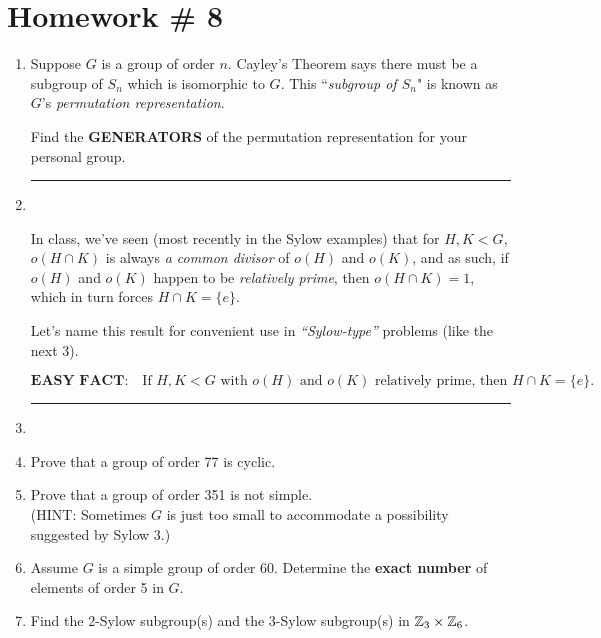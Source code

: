 \section{Homework \# 8}
\label{sec:HW8}

\begin{enumerate}
    \item Suppose $ G $ is a group of order $ n $. Cayley’s Theorem says there must be a subgroup of $ S_n $ which is isomorphic to $ G $.  
    This ``\textit{subgroup of $ S_n $}" is known as $ G $'s \textit{permutation representation}.  

    Find the \textbf{GENERATORS} of the permutation representation for your personal group.  \\ \steezybreak

    \item[] \rule{\textwidth}{0.4pt} \\ \steezybreak

    In class, we’ve seen (most recently in the Sylow examples) that for $ H, K < G $, $ o(H \cap K) $ is always \textit{a common divisor} of $ o(H) $ and $ o(K) $,  
    and as such, if $ o(H) $ and $ o(K) $ happen to be \textit{relatively prime}, then  
    $ o(H \cap K) = 1 $, which in turn forces $ H \cap K = \{e\} $.  \\ \steezybreak

    Let’s name this result for convenient use in  
    \textit{“Sylow-type”} problems (like the next 3).  

    \[
    \boxed{\textbf{EASY FACT:} \quad \text{If } H, K < G \text{ with } o(H) \text{ and } o(K) \text{ relatively prime, then } H \cap K = \{e\}.}
    \]

    \item[] \rule{\textwidth}{0.4pt} \\ \steezybreak

    \item Prove that a group of order 77 is cyclic.  \\ \steezybreak

    \item Prove that a group of order 351 is not simple.  \\
    (HINT: Sometimes $ G $ is just too small to accommodate a possibility suggested by Sylow $ 3 $.)  \\ \steezybreak

    \item Assume $ G $ is a simple group of order 60.  
    Determine the \textbf{exact number} of elements of order 5 in $ G $.  \\ \steezybreak

    \item Find the 2-Sylow subgroup(s) and the 3-Sylow subgroup(s) in $ {\mathbb{Z}}_3 \times {\mathbb{Z}}_6 $.  

\end{enumerate}
\newpage 


